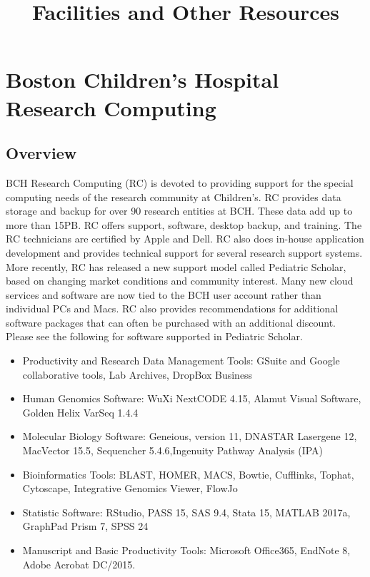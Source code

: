 \documentclass[11pt]{amsart}
\title{Facilities and Other Resources}
\author{}
\date{}
\begin{document}
\maketitle
\hypertarget{x-boston-children’s-hospital-research-computing}{\section*{Boston Children’s Hospital Research Computing}}
\hypertarget{x-overview}{\subsection*{Overview}}
BCH Research Computing (RC) is devoted to providing support for the special computing needs of the research community at Children’s. RC provides data storage and backup for over 90 research entities at BCH. These data add up to more than 15PB. RC offers support, software, desktop backup, and training. The RC technicians are certified by Apple and Dell. RC also does in-house application development and provides technical support for several research support systems. More recently, RC has released a new support model called Pediatric Scholar, based on changing market conditions and community interest. Many new cloud services and software are now tied to the BCH user account rather than individual PCs and Macs. RC also provides recommendations for additional software packages that can often be purchased with an additional discount. Please see the following for software supported in Pediatric Scholar.


\begin{itemize}

\item Productivity and Research Data Management Tools: GSuite and Google collaborative tools, Lab Archives, DropBox Business

\item Human Genomics Software: WuXi NextCODE 4.15, Alamut Visual Software, Golden Helix VarSeq 1.4.4

\item Molecular Biology Software: Geneious, version 11, DNASTAR Lasergene 12, MacVector 15.5, Sequencher 5.4.6,Ingenuity Pathway Analysis (IPA)

\item Bioinformatics Tools: BLAST, HOMER, MACS, Bowtie, Cufflinks, Tophat, Cytoscape, Integrative Genomics Viewer, FlowJo

\item Statistic Software: RStudio,  PASS 15, SAS 9.4, Stata 15, MATLAB 2017a, GraphPad Prism 7, SPSS 24

\item Manuscript and Basic Productivity Tools: Microsoft Office365, EndNote 8, Adobe Acrobat DC/2015.

\end{itemize}
\end{document}
